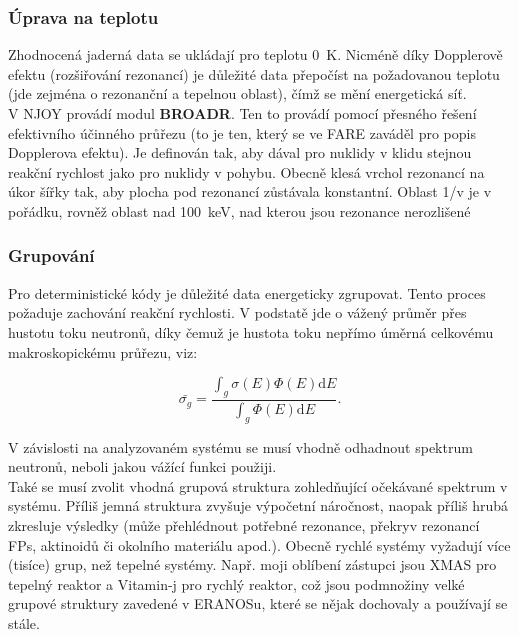\subsubsection{Úprava na teplotu}

Zhodnocená jaderná data se ukládají pro teplotu 0~K. Nicméně díky Dopplerově efektu (rozšiřování rezonancí) je důležité data přepočíst na požadovanou teplotu (jde zejména o rezonanční a tepelnou oblast), čímž se mění energetická síť.\\

V NJOY provádí modul \textbf{BROADR}. Ten to provádí pomocí přesného řešení efektivního účinného průřezu (to je ten, který se ve FARE zaváděl pro popis Dopplerova efektu). Je definován tak, aby dával pro nuklidy v klidu stejnou reakční rychlost jako pro nuklidy v pohybu. Obecně klesá vrchol rezonancí na úkor šířky tak, aby plocha pod rezonancí zůstávala konstantní. Oblast 1/v je v pořádku, rovněž oblast nad 100~keV, nad kterou jsou rezonance nerozlišené

\subsubsection{Grupování}

Pro deterministické kódy je důležité data energeticky zgrupovat. Tento proces požaduje zachování reakční rychlosti. V podstatě jde o vážený průměr přes hustotu toku neutronů, díky čemuž je hustota toku nepřímo úměrná celkovému makroskopickému průřezu, viz:

\begin{equation}
  \boxed{
    \bar{\sigma_g} = \dfrac{\int_g \sigma(E) \Phi(E) \text{d}E}{\int_g \Phi(E) \text{d}E}.}
    \label{grupovani}
\end{equation}

V závislosti na analyzovaném systému se musí vhodně odhadnout spektrum neutronů, neboli jakou vážící funkci použiji.\\

Také se musí zvolit vhodná grupová struktura zohledňující očekávané spektrum v systému. Příliš jemná struktura zvyšuje výpočetní náročnost, naopak příliš hrubá zkresluje výsledky (může přehlédnout potřebné rezonance, překryv rezonancí FPs, aktinoidů či okolního materiálu apod.). Obecně rychlé systémy vyžadují více (tisíce) grup, než tepelné systémy. Např. moji oblíbení zástupci jsou XMAS pro tepelný reaktor a Vitamin-j pro rychlý reaktor, což jsou podmnožiny velké grupové struktury zavedené v ERANOSu, které se nějak dochovaly a používají se stále.\\

